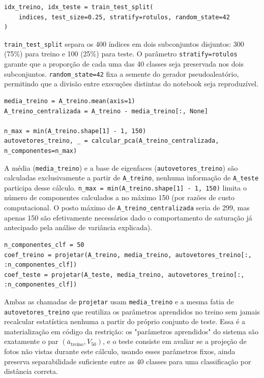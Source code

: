 \documentclass[12pt,a4paper]{article}
\begin{document}
\begin{lstlisting}
idx_treino, idx_teste = train_test_split(
    indices, test_size=0.25, stratify=rotulos, random_state=42
)
\end{lstlisting}

\texttt{train\_test\_split} separa os 400 índices em dois subconjuntos disjuntos:
300 (75\%) para treino e 100 (25\%) para teste. O parâmetro
\texttt{stratify=rotulos} garante que a proporção de cada uma das 40 classes seja preservada
nos dois subconjuntos. \texttt{random\_state=42} fixa a semente do
gerador pseudoaleatório, permitindo que a divisão entre
execuções distintas do notebook seja reproduzível.

\begin{lstlisting}
media_treino = A_treino.mean(axis=1)
A_treino_centralizada = A_treino - media_treino[:, None]

n_max = min(A_treino.shape[1] - 1, 150)
autovetores_treino, _ = calcular_pca(A_treino_centralizada, n_componentes=n_max)
\end{lstlisting}

A média (\texttt{media\_treino}) e a base de eigenfaces (\texttt{autovetores\_treino}) são calculadas
exclusivamente a partir de \texttt{A\_treino}, nenhuma informação de \texttt{A\_teste}
participa desse cálculo. \texttt{n\_max = min(A\_treino.shape[1] - 1, 150)} limita o número de componentes
calculados a no máximo 150 (por razões de custo computacional. O posto máximo de
\texttt{A\_treino\_centralizada} seria de 299,
mas apenas 150 são efetivamente necessários dado o comportamento de saturação já
antecipado pela análise de variância explicada).

\begin{lstlisting}
n_componentes_clf = 50
coef_treino = projetar(A_treino, media_treino, autovetores_treino[:, :n_componentes_clf])
coef_teste = projetar(A_teste, media_treino, autovetores_treino[:, :n_componentes_clf])
\end{lstlisting}

Ambas as chamadas de \texttt{projetar} usam \texttt{media\_treino} e a mesma fatia de
\texttt{autovetores\_treino} que reutiliza os
parâmetros aprendidos no treino sem jamais recalcular estatística nenhuma a partir do
próprio conjunto de teste. Essa é a materialização em código da restrição:
os "parâmetros aprendidos" do sistema são exatamente o par
$(\bar a_{\text{treino}}, V_{50})$, e o teste consiste em avaliar se a projeção de
fotos não vistas durante este cálculo, usando esses parâmetros fixos, ainda preserva
separabilidade suficiente entre as 40 classes para uma classificação por distância
correta.
\end{document}
